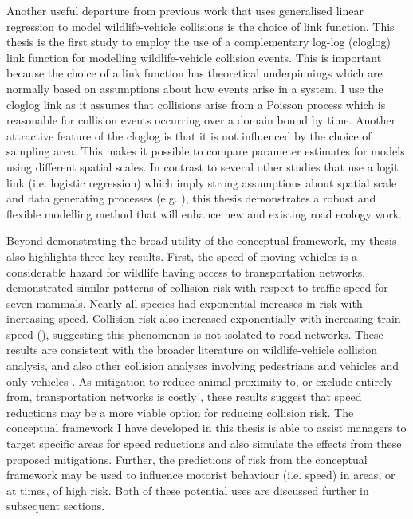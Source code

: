 Another useful departure from previous work that uses generalised linear regression to model wildlife-vehicle collisions is the choice of link function. This thesis is the first study to employ the use of a complementary log-log (cloglog) link function for modelling wildlife-vehicle collision events. This is important because the choice of a link function has theoretical underpinnings which are normally based on assumptions about how events arise in a system. I use the cloglog link as it assumes that collisions arise from a Poisson process which is reasonable for collision events occurring over a domain bound by time. Another attractive feature of the cloglog is that it is not influenced by the choice of sampling area. This makes it possible to compare parameter estimates for models using different spatial scales.  In contrast to several other studies that use a logit link (i.e. logistic regression) which imply strong assumptions about spatial scale and data generating processes (e.g. \cite{seo15,gund98}), this thesis demonstrates a robust and flexible modelling method that will enhance new and existing road ecology work.

Beyond demonstrating the broad utility of the conceptual framework, my thesis also highlights three key results. First, the speed of moving vehicles is a considerable hazard for wildlife having access to transportation networks.  demonstrated similar patterns of collision risk with respect to traffic speed for seven mammals. Nearly all species had exponential increases in risk with increasing speed. Collision risk also increased exponentially with increasing train speed (), suggesting this phenomenon is not isolated to road networks. These results are consistent with the broader literature on wildlife-vehicle collision analysis, and also other collision analyses involving pedestrians and vehicles \citep{rosen09} and only vehicles \citep{liu97}. As mitigation to reduce animal proximity to, or exclude entirely from, transportation networks is costly \citep{huij09}, these results suggest that speed reductions may be a more viable option for reducing collision risk. The conceptual framework I have developed in this thesis is able to assist managers to target specific areas for speed reductions and also simulate the effects from these proposed mitigations. Further, the predictions of risk from the conceptual framework may be used to influence motorist behaviour (i.e. speed) in areas, or at times, of high risk. Both of these potential uses are discussed further in subsequent sections.

